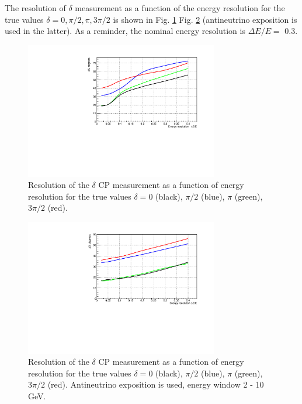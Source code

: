 \documentclass[prd,showpacs,groupedaddress,superscriptaddress,amsmath,amssymb]{revtex4-2} %
\begin{document}
 The resolution of $\delta$ measurement as a function of the energy resolution for the true values $\delta = 0, \pi/2, \pi, 3\pi/2$ is shown
in Fig. \ref{fig:del_delres_eres} Fig. \ref{fig:del_delres_eres_anu} (antineutrino exposition is used in the latter). As a reminder, the
nominal energy resolution is $\Delta E / E =$ 0.3.

\begin{figure}[h]
\begin{center}
\includegraphics[width=0.75\textwidth]{del_delres_eres.pdf}
\caption {Resolution of the $\delta$ CP measurement as a function of energy resolution for the true values $\delta = 0$ (black), $\pi/2$ (blue),
$\pi$ (green), $3\pi/2$ (red).
\label{fig:del_delres_eres}}
\end{center}
\end{figure}

\begin{figure}[h]
\begin{center}
\includegraphics[width=0.75\textwidth]{del_delres_eres_anu.pdf}
\caption {Resolution of the $\delta$ CP measurement as a function of energy resolution for the true values $\delta = 0$ (black), $\pi/2$ (blue),
$\pi$ (green), $3\pi/2$ (red). Antineutrino exposition is used, energy window 2 - 10 GeV.
\label{fig:del_delres_eres_anu}}
\end{center}
\end{figure}
\end{document}
